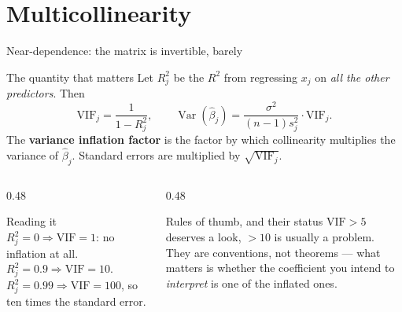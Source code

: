 \documentclass[aspectratio=169]{beamer}
\begin{document}
\section[VIF]{Multicollinearity}
\label{sec:mc}

\begin{frame}[shrink=6]{Near-dependence: the matrix is invertible, barely}
  \begin{block}{The quantity that matters}
    Let $R_j^2$ be the $R^2$ from regressing $x_j$ on \emph{all the other
    predictors}. Then
    \[
      \mathrm{VIF}_j = \frac{1}{1 - R_j^2},
      \qquad
      \operatorname{Var}(\hat\beta_j) =
      \frac{\sigma^2}{(n-1)s_j^2}\cdot \mathrm{VIF}_j .
    \]
    The \textbf{variance inflation factor} is the factor by which collinearity
    multiplies the variance of $\hat\beta_j$. Standard errors are multiplied
    by $\sqrt{\mathrm{VIF}_j}$.
  \end{block}
  \begin{columns}[T]
    \begin{column}{0.48\textwidth}
      \begin{exampleblock}{Reading it}
        \small $R_j^2 = 0 \Rightarrow \mathrm{VIF} = 1$: no inflation at all.
        $R_j^2 = 0.9 \Rightarrow \mathrm{VIF} = 10$. $R_j^2 = 0.99
        \Rightarrow \mathrm{VIF} = 100$, so ten times the standard error.
      \end{exampleblock}
    \end{column}
    \begin{column}{0.48\textwidth}
      \begin{alertblock}{Rules of thumb, and their status}
        \small $\mathrm{VIF} > 5$ deserves a look, $> 10$ is usually a
        problem. They are conventions, not theorems --- what matters is
        whether the coefficient you intend to \emph{interpret} is one of the
        inflated ones.
      \end{alertblock}
    \end{column}
  \end{columns}
\end{frame}
\end{document}
